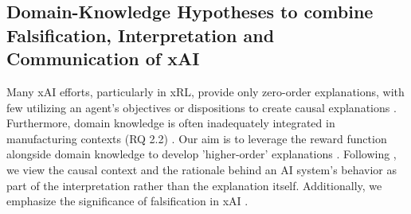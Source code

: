 \subsection[Domain-knowledge hypotheses]{Domain-Knowledge Hypotheses to combine Falsification, Interpretation and Communication of xAI}
Many xAI efforts, particularly in xRL, provide only zero-order explanations, with few utilizing an agent's objectives or dispositions to create causal explanations . Furthermore, domain knowledge is often inadequately integrated in manufacturing contexts (RQ 2.2) . Our aim is to leverage the reward function alongside domain knowledge  to develop 'higher-order' explanations . Following , we view the causal context and the rationale behind an AI system's behavior as part of the interpretation rather than the explanation itself. Additionally, we emphasize the significance of falsification in xAI .
